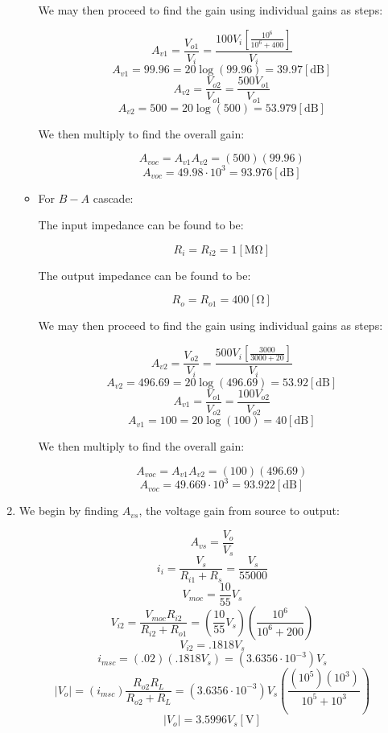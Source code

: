 \begin{enumerate}
\begin{itemize}
        \begin{center}
          We may then proceed to find the gain using individual gains as steps:
        \end{center}
        $$A_{v1}=\frac{V_{o1}}{V_i}=\frac{100V_i\left[ \frac{10^6}{10^6+400} \right]}{V_i}$$
        $$A_{v1}=99.96=20\log(99.96)=39.97[\text{dB}]$$
        $$A_{v2}=\frac{V_{o2}}{V_{o1}}=\frac{500V_{o1}}{V_{o1}}$$
        $$A_{v2}=500=20\log(500)=53.979[\text{dB}]$$

        \begin{center}
          We then multiply to find the overall gain:
        \end{center}
        $$A_{voc}=A_{v1}A_{v2}=(500)(99.96)$$
        $$\boxed{A_{voc}=49.98\cdot10^3=93.976[\text{dB}]}$$

      \item For $B-A$ cascade:

        \begin{center}
          The input impedance can be found to be:
        \end{center}
        $$\boxed{R_i=R_{i2}=1[\si{\mega\ohm}]}$$

        \begin{center}
          The output impedance can be found to be:
        \end{center}
        $$\boxed{R_o=R_{o1}=400[\si{\ohm}]}$$

        \begin{center}
          We may then proceed to find the gain using individual gains as steps:
        \end{center}
        $$A_{v2}=\frac{V_{o2}}{V_i}=\frac{500V_i\left[ \frac{3000}{3000+20} \right]}{V_i}$$
        $$A_{v2}=496.69=20\log(496.69)=53.92[\text{dB}]$$
        $$A_{v1}=\frac{V_{o1}}{V_{o2}}=\frac{100V_{o2}}{V_{o2}}$$
        $$A_{v1}=100=20\log(100)=40[\text{dB}]$$

        \begin{center}
          We then multiply to find the overall gain:
        \end{center}
        $$A_{voc}=A_{v1}A_{v2}=(100)(496.69)$$
        $$\boxed{A_{voc}=49.669\cdot10^3=93.922[\text{dB}]}$$

    \end{itemize}

  \item

    \begin{center}
      We begin by finding $A_{vs}$, the voltage gain from source to output:
    \end{center}
    $$A_{vs}=\frac{V_o}{V_s}$$
    $$i_i=\frac{V_s}{R_{i1}+R_s}=\frac{V_s}{55000}$$
    $$V_{moc}=\frac{10}{55}V_s$$
    $$V_{i2}=\frac{V_{moc}R_{i2}}{R_{i2}+R_{o1}}=\left( \frac{10}{55}V_s \right)\left( \frac{10^6}{10^6+200} \right)$$
    $$V_{i2}=.1818V_s$$
    $$i_{msc}=(.02)(.1818V_s)=(3.6356\cdot10^{-3})V_s$$
    $$|V_o|=(i_{msc})\frac{R_{o2}R_L}{R_{o2}+R_L}=(3.6356\cdot10^{-3})V_s\left( \frac{(10^5)(10^3)}{10^5+10^3} \right)$$
    $$|V_o|=3.5996V_s[\si{\volt}]$$


\end{enumerate}
